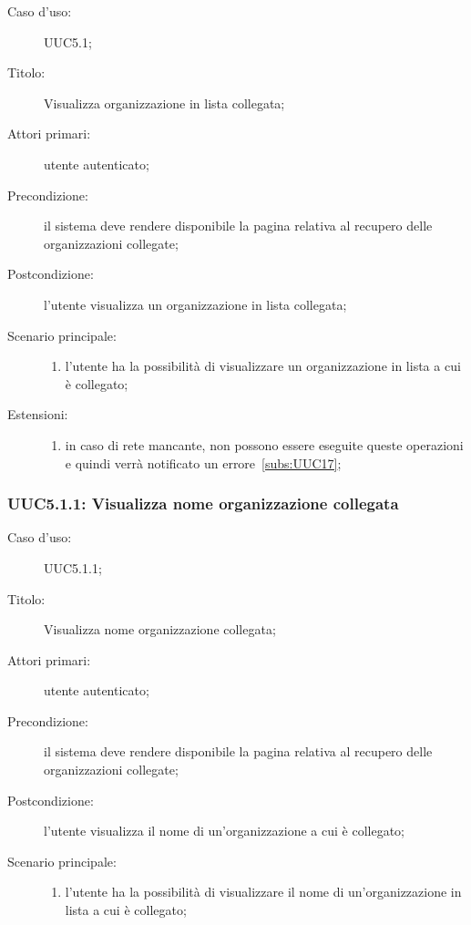 \documentclass[../../../analisi-dei-requisiti.tex]{subfiles}
\begin{document}
\begin{description}
  \item[Caso d’uso:] UUC5.1;
  \item[Titolo:] Visualizza organizzazione in lista collegata;
  \item[Attori primari:] utente autenticato;
  \item[Precondizione:] il sistema deve rendere disponibile la pagina relativa al recupero delle organizzazioni collegate;
  \item[Postcondizione:] l'utente visualizza un organizzazione in lista collegata;
  \item[Scenario principale:]
        \begin{enumerate}
          \item l'utente ha la possibilità di visualizzare un organizzazione in lista a cui è collegato;
        \end{enumerate}
  \item[Estensioni:]
        \begin{enumerate}
          \item in caso di rete mancante, non possono essere eseguite queste operazioni e quindi verrà notificato un errore~\ref{subs:UUC17};
        \end{enumerate}
\end{description}


\subsubsection{UUC5.1.1: Visualizza nome organizzazione collegata}%
\label{subs:UUC5.1.1}
\begin{description}
  \item[Caso d’uso:] UUC5.1.1;
  \item[Titolo:] Visualizza nome organizzazione collegata;
  \item[Attori primari:] utente autenticato;
  \item[Precondizione:] il sistema deve rendere disponibile la pagina relativa al recupero delle organizzazioni collegate;
  \item[Postcondizione:] l'utente visualizza il nome di un'organizzazione a cui è collegato;
  \item[Scenario principale:]
        \begin{enumerate}
          \item l'utente ha la possibilità di visualizzare il nome di un'organizzazione in lista a cui è collegato;
        \end{enumerate}
\end{description}
\end{document}
